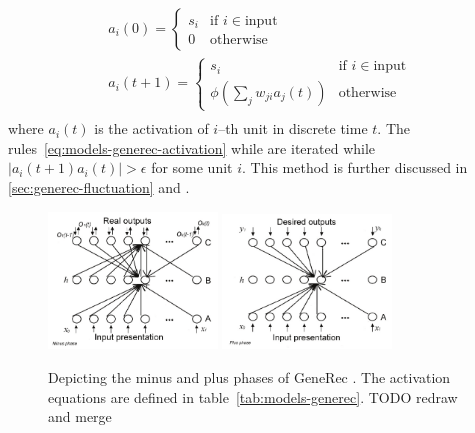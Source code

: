 \begin{align}
  \label{eq:models-generec-activation}
  a_i(0) = \left\{
	\begin{array}{ll}
		s_i & \mbox{if } i \in \mbox{input} \nonumber \\
		0 & \mbox{otherwise} \nonumber 
	\end{array}
\right. \\
  a_i(t+1) = \left\{
	\begin{array}{ll}
		s_i & \mbox{if } i \in \mbox{input} \nonumber \\
		\phi(\sum_j w_{ji}a_j(t)) & \mbox{otherwise} \nonumber 
	\end{array}
\right. \\
\end{align} 
where $a_i(t)$ is the activation of $i$--th unit in discrete time $t$. The rules~\ref{eq:models-generec-activation} while are iterated while $|a_i(t+1) a_i(t)| > \epsilon$ for some unit $i$. This method is further discussed in \ref{sec:generec-fluctuation} and \citep{orru2008sabio}.

\begin{figure}[h]
  \centering
  \includegraphics[width=0.4\textwidth]{img/generec_minus_phase.png}
  \includegraphics[width=0.4\textwidth]{img/generec_plus_phase.png}
  \caption{Depicting the minus and plus phases of GeneRec \citet{orru2008sabio}. The activation equations are defined in table~\ref{tab:models-generec}. TODO redraw and merge} 
  \label{fig:models-generec-phase}
\end{figure}

